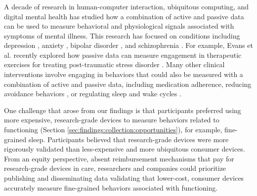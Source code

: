 \subsubsection{}
\label{sec:discussion:tech:validating}
A decade of research in human-computer interaction, ubiquitous computing, and digital mental health has studied how a combination of active and passive data can be used to measure behavioral and physiological signals associated with symptoms of mental illness.
This research has focused on conditions including depression \cite{xu_globem_2023, adler_identifying_2021, nepal_moodcapture_2024}, anxiety \cite{das_swain_semantic_2022}, bipolar disorder \cite{frost_supporting_2013}, and schizophrenia \cite{wang_crosscheck_2016, wang_predicting_2017}.
For example, Evans et al. recently explored how passive data can measure engagement in therapeutic exercises for treating post-traumatic stress disorder \cite{evans_using_2024}.
Many other clinical interventions involve engaging in behaviors that could also be measured with a combination of active and passive data, including medication adherence, reducing avoidance behaviors \cite{jacobson_behavioral_2001, hopko_behavioral_2004}, or regulating sleep and wake cycles \cite{frank_interpersonal_2001}.

One challenge that arose from our findings is that participants preferred using more expensive, research-grade devices to measure behaviors related to functioning (Section \ref{sec:findings:collection:opportunities}), for example, fine-grained sleep.
Participants believed that research-grade devices were more rigorously validated than less-expensive and more ubiquitous consumer devices.
From an equity perspective, absent reimbursement mechanisms that pay for research-grade devices in care, researchers and companies could prioritize publishing and disseminating data validating that lower-cost, consumer devices accurately measure fine-grained behaviors associated with functioning.

